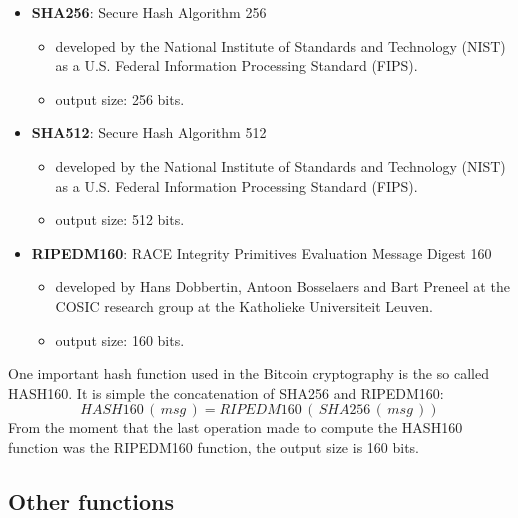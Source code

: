 \begin{itemize}
	\item \textbf{SHA256}: Secure Hash Algorithm 256
	\begin{itemize}
		\item developed by the National Institute of Standards and Technology (NIST) as a U.S. Federal Information Processing Standard (FIPS).
		\item output size: 256 bits.
	\end{itemize}
	\item \textbf{SHA512}: Secure Hash Algorithm 512
	\begin{itemize}
		\item developed by the National Institute of Standards and Technology (NIST) as a U.S. Federal Information Processing Standard (FIPS).
		\item output size: 512 bits.
	\end{itemize}
	\item \textbf{RIPEDM160}: RACE Integrity Primitives Evaluation Message Digest 160
	\begin{itemize}
		\item developed by Hans Dobbertin, Antoon Bosselaers and Bart Preneel at the COSIC research group at the Katholieke Universiteit Leuven. 
		\item output size: 160 bits.
	\end{itemize}
\end{itemize}
One important hash function used in the Bitcoin cryptography is the so called HASH160. It is simple the concatenation of SHA256 and RIPEDM160:
\begin{equation*}
HASH160 \, (\, msg\, ) = RIPEDM160\, (\, SHA256 \, (\, msg \, ))
\end{equation*}
From the moment that the last operation made to compute the HASH160 function was the RIPEDM160 function, the output size is 160 bits.

\subsection{Other functions}

